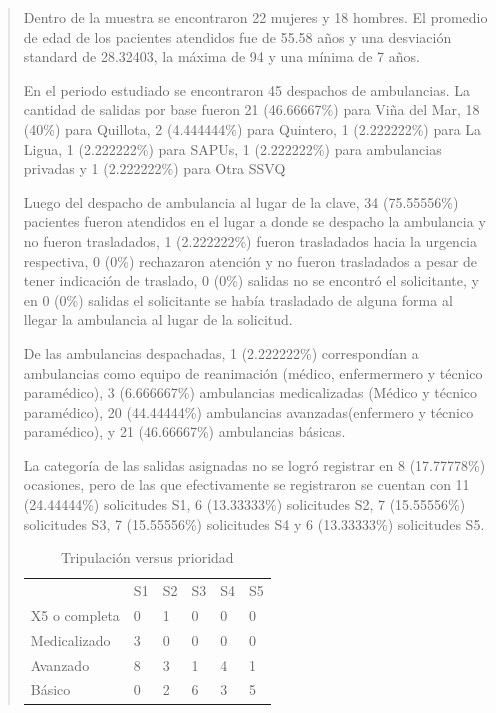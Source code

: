 \documentclass{article}
\begin{document}
\begin{quotation}



Dentro de la muestra se encontraron 22 mujeres y 18 hombres. El promedio de edad de los pacientes atendidos fue de 55.58 años y una desviación standard de 28.32403, la máxima de 94 y una mínima de 7 años.

En el periodo estudiado se encontraron 45 despachos de ambulancias. La cantidad de salidas por base fueron 21 (46.66667\%) para Viña del Mar, 18 (40\%) para Quillota, 2 (4.444444\%) para Quintero, 1 (2.222222\%) para La Ligua, 1 (2.222222\%) para SAPUs, 1 (2.222222\%) para ambulancias privadas y 1 (2.222222\%) para Otra SSVQ

Luego del despacho de ambulancia al lugar de la clave, 34 (75.55556\%) pacientes fueron atendidos en el lugar a donde se despacho la ambulancia y no fueron trasladados, 1 (2.222222\%) fueron trasladados hacia la urgencia respectiva, 0 (0\%) rechazaron atención y no fueron trasladados a pesar de tener indicación de traslado, 0 (0\%) salidas no se encontró el solicitante, y en 0 (0\%) salidas el solicitante se había trasladado de alguna forma al llegar la ambulancia al lugar de la solicitud. 

De las ambulancias despachadas, 1 (2.222222\%) correspondían a ambulancias como equipo de reanimación (médico, enfermermero y técnico paramédico), 3 (6.666667\%) ambulancias medicalizadas (Médico y técnico paramédico), 20 (44.44444\%) ambulancias avanzadas(enfermero y técnico paramédico), y 21 (46.66667\%) ambulancias básicas.

La categoría de las salidas asignadas no se logró registrar en 8 (17.77778\%) ocasiones, pero de las que efectivamente se registraron se cuentan con 11 (24.44444\%) solicitudes S1, 6 (13.33333\%) solicitudes S2, 7 (15.55556\%) solicitudes S3, 7 (15.55556\%) solicitudes S4 y 6 (13.33333\%) solicitudes S5.
               
\begin{table}[h]
\centering

\begin{tabular}{llllll}
              & S1 & S2 & S3 & S4 & S5 \\
X5 o completa & 0  & 1  & 0  & 0  & 0  \\
Medicalizado  & 3  & 0  & 0  & 0  & 0  \\
Avanzado      & 8  & 3  & 1  & 4  & 1  \\
Básico        & 0  & 2  & 6  & 3  & 5 
\end{tabular}
\caption{Tripulación versus prioridad}
\label{my-label}
\end{table}


\end{quotation}
\end{document}
